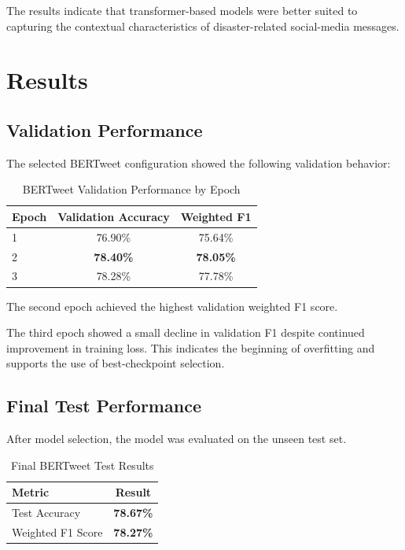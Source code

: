 \documentclass[12pt,a4paper]{article}
\begin{document}
The results indicate that transformer-based models were better suited to
capturing the contextual characteristics of disaster-related social-media
messages.

\section{Results}

\subsection{Validation Performance}

The selected BERTweet configuration showed the following validation behavior:

\begin{table}[H]
\centering
\caption{BERTweet Validation Performance by Epoch}
\begin{tabular}{lcc}
\toprule
\textbf{Epoch} & \textbf{Validation Accuracy} &
\textbf{Weighted F1} \\
\midrule
1 & 76.90\% & 75.64\% \\
2 & \textbf{78.40\%} & \textbf{78.05\%} \\
3 & 78.28\% & 77.78\% \\
\bottomrule
\end{tabular}
\end{table}

The second epoch achieved the highest validation weighted F1 score.

The third epoch showed a small decline in validation F1 despite continued
improvement in training loss. This indicates the beginning of overfitting and
supports the use of best-checkpoint selection.

\subsection{Final Test Performance}

After model selection, the model was evaluated on the unseen test set.

\begin{table}[H]
\centering
\caption{Final BERTweet Test Results}
\begin{tabular}{lc}
\toprule
\textbf{Metric} & \textbf{Result} \\
\midrule
Test Accuracy & \textbf{78.67\%} \\
Weighted F1 Score & \textbf{78.27\%} \\
\bottomrule
\end{tabular}
\end{table}
\end{document}
